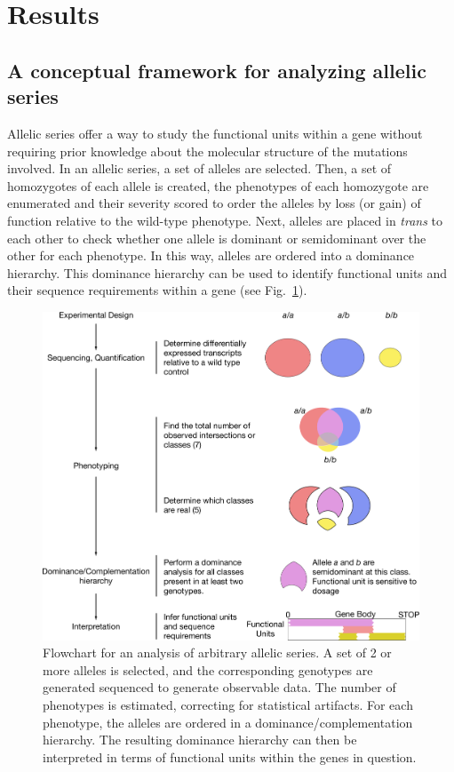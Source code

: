 \documentclass[10pt, twocolumn]{article}
\begin{document}
\section*{Results}
\subsection*{A conceptual framework for analyzing allelic series}
Allelic series offer a way to study the functional units within a gene without
requiring prior knowledge about the molecular structure of the mutations
involved. In an allelic series, a set of alleles are selected. Then, a set of
homozygotes of each allele is created, the phenotypes of each homozygote are
enumerated and their severity scored to order the alleles by loss (or gain) of
function relative to the wild-type phenotype. Next, alleles are placed in
\emph{trans} to each other to check whether one allele is dominant or
semidominant over the other for each phenotype. In this way, alleles are ordered
into a dominance hierarchy. This dominance hierarchy can be used to identify
functional units and their sequence requirements within a gene (see
Fig.~\ref{fig:flowchart}).

\begin{figure}
  \includegraphics[width=\textwidth]{../figs/flowchart.pdf}
  \caption{Flowchart for an analysis of arbitrary allelic series. A set of 2 or
  more alleles is selected, and the corresponding genotypes are generated
  sequenced to generate observable data. The number of phenotypes is estimated,
  correcting for statistical artifacts. For each phenotype, the alleles are
  ordered in a dominance/complementation hierarchy. The resulting dominance
  hierarchy can then be interpreted in terms of functional units within the
  genes in question.}
\label{fig:flowchart}
\end{figure}
\end{document}
